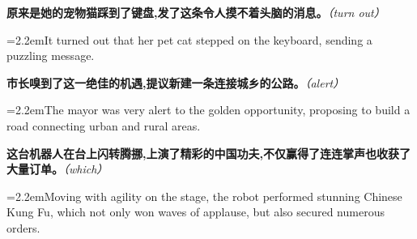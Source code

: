 \documentclass[11pt,a4paper]{article}
\newcommand{\num}[1]{\makebox[1.9em][r]{#1.}\hspace{0.3em}}
\newcommand{\prompt}[1]{\emph{\textcolor{tipblue}{\small（#1）}}}
\begin{document}
\begin{minipage}{\linewidth}

\num{46}\textbf{原来是她的宠物猫踩到了键盘,发了这条令人摸不着头脑的消息。}\prompt{turn out}

\vspace{0.15em}

\noindent\hangindent=2.2em\hspace{2.2em}It turned out that her pet cat stepped on the keyboard, sending a puzzling message.

\end{minipage}

\begin{minipage}{\linewidth}

\num{47}\textbf{市长嗅到了这一绝佳的机遇,提议新建一条连接城乡的公路。}\prompt{alert}

\vspace{0.15em}

\noindent\hangindent=2.2em\hspace{2.2em}The mayor was very alert to the golden opportunity, proposing to build a road connecting urban and rural areas.

\end{minipage}

\begin{minipage}{\linewidth}

\num{48}\textbf{这台机器人在台上闪转腾挪,上演了精彩的中国功夫,不仅赢得了连连掌声也收获了大量订单。}\prompt{which}

\vspace{0.15em}

\noindent\hangindent=2.2em\hspace{2.2em}Moving with agility on the stage, the robot performed stunning Chinese Kung Fu, which not only won waves of applause, but also secured numerous orders.

\end{minipage}
\end{document}
